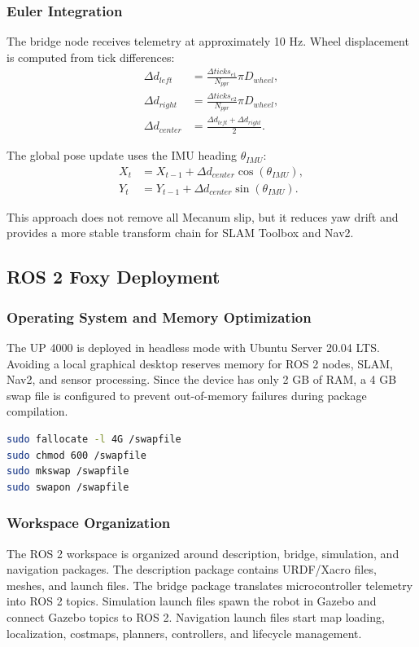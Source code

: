 \documentclass{llncs}
\begin{document}
\subsubsection{Euler Integration}
The bridge node receives telemetry at approximately 10 Hz. Wheel displacement is computed from tick differences:
\begin{align}
\Delta d_{left} &= \frac{\Delta ticks_{e1}}{N_{ppr}} \pi D_{wheel},\\
\Delta d_{right} &= \frac{\Delta ticks_{e2}}{N_{ppr}} \pi D_{wheel},\\
\Delta d_{center} &= \frac{\Delta d_{left} + \Delta d_{right}}{2}.
\end{align}

The global pose update uses the IMU heading $\theta_{IMU}$:
\begin{align}
X_t &= X_{t-1} + \Delta d_{center}\cos(\theta_{IMU}),\\
Y_t &= Y_{t-1} + \Delta d_{center}\sin(\theta_{IMU}).
\end{align}

This approach does not remove all Mecanum slip, but it reduces yaw drift and provides a more stable transform chain for SLAM Toolbox and Nav2.

\subsection{ROS 2 Foxy Deployment} 
\subsubsection{Operating System and Memory Optimization}
The UP 4000 is deployed in headless mode with Ubuntu Server 20.04 LTS. Avoiding a local graphical desktop reserves memory for ROS 2 nodes, SLAM, Nav2, and sensor processing. Since the device has only 2 GB of RAM, a 4 GB swap file is configured to prevent out-of-memory failures during package compilation.

\begin{lstlisting}[language=bash,caption={Swap configuration for the UP 4000.}]
sudo fallocate -l 4G /swapfile
sudo chmod 600 /swapfile
sudo mkswap /swapfile
sudo swapon /swapfile
\end{lstlisting}

\subsubsection{Workspace Organization}
The ROS 2 workspace is organized around description, bridge, simulation, and navigation packages. The description package contains URDF/Xacro files, meshes, and launch files. The bridge package translates microcontroller telemetry into ROS 2 topics. Simulation launch files spawn the robot in Gazebo and connect Gazebo topics to ROS 2. Navigation launch files start map loading, localization, costmaps, planners, controllers, and lifecycle management.
\end{document}
